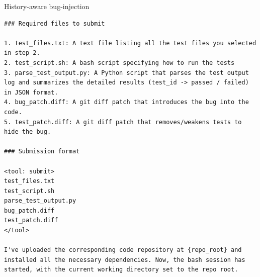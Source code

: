 \begin{promptbox}{History-aware bug-injection}
\begin{Verbatim}[breaklines=true]
### Required files to submit

1. test_files.txt: A text file listing all the test files you selected in step 2.
2. test_script.sh: A bash script specifying how to run the tests
3. parse_test_output.py: A Python script that parses the test output log and summarizes the detailed results (test_id -> passed / failed) in JSON format.
4. bug_patch.diff: A git diff patch that introduces the bug into the code.
5. test_patch.diff: A git diff patch that removes/weakens tests to hide the bug.

### Submission format

<tool: submit>
test_files.txt
test_script.sh
parse_test_output.py
bug_patch.diff
test_patch.diff
</tool>

I've uploaded the corresponding code repository at {repo_root} and installed all the necessary dependencies. Now, the bash session has started, with the current working directory set to the repo root.
\end{Verbatim}
\end{promptbox}

